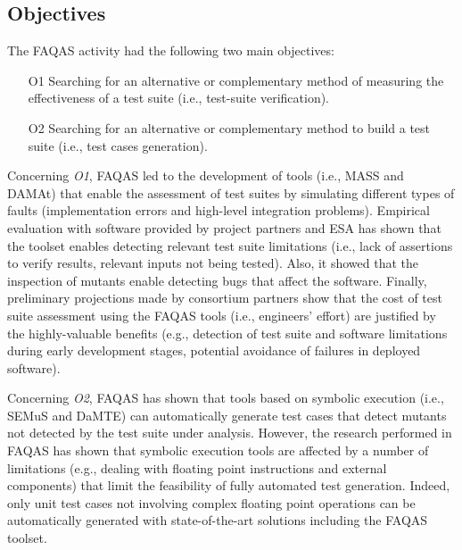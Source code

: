 
\STARTCHANGEDWPT

\subsection{Objectives}

The FAQAS activity had the following two main objectives:
\begin{itemize}
\item[O1] Searching for an alternative or complementary method of measuring the effectiveness of a test suite (i.e., test-suite verification).
\item[O2] Searching for an alternative or complementary method to build a test suite (i.e., test cases generation).
\end{itemize}

Concerning \emph{O1}, FAQAS led to the development of tools (i.e., MASS and DAMAt) that enable the assessment of test suites by simulating different types of faults (implementation errors and high-level integration problems). Empirical evaluation with software provided by project partners and ESA has shown that the toolset enables detecting relevant test suite limitations (i.e., lack of assertions to verify results, relevant inputs not being tested). Also, it showed that the inspection of mutants enable detecting bugs that affect the software. Finally, preliminary projections made by consortium partners show that the cost of test suite assessment using the FAQAS tools (i.e., engineers' effort) are justified by the highly-valuable benefits (e.g., detection of test suite and software limitations during early development stages, potential avoidance of failures in deployed software).

Concerning \emph{O2}, FAQAS has shown that tools based on symbolic execution (i.e., SEMuS and DaMTE) can automatically generate test cases that detect mutants not detected by the test suite under analysis. However, the research performed in FAQAS has shown that
symbolic execution tools
are affected by a number of limitations (e.g., dealing with floating point instructions and external components) that limit the feasibility of fully automated test generation. Indeed, only unit test cases not involving complex floating point operations can be automatically generated with state-of-the-art solutions including the FAQAS toolset.

